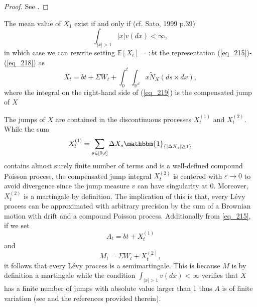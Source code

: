 \begin{proof}
See .
\end{proof}
\begin{remark}
The mean value of $X_1$ exist if and only if (cf. Sato, 1999 p.39) $$\int_{|x| > 1}  |x| v(dx)< \infty,$$ in which case we can rewrite setting $\mathbb{E}[X_t]=: bt$ the representation (\ref{eq_215})-(\ref{eq_218}) as 
\begin{equation}\label{eq_219}
    X_t = bt + \Sigma W_t + \int_0^t \int_{\mathbb{R}^d} x \tilde{N}_X (ds \times dx),
\end{equation}
where the integral on the right-hand side of (\ref{eq_219}) is the compensated jump of $X$
\end{remark}

\begin{interpretation}The jumps of $X$ are contained in the discontinuous processes $ X^{(1)}_t$ and $ X^{(2)}_t$. While the sum $$ X^{(1)}_t = \sum_{s \in [0,t]} \Delta X_s \mathbbm{1}_{\{|\Delta X_s|\geq 1\}} $$ contains almost surely finite number of terms and is a well-defined compound Poisson process, the compensated jump integral $X^{(2)}_t$ is centered with $\varepsilon \to 0$ to avoid divergence since the jump measure $v$ can have singularity at 0. Moreover, $ X^{(2)}_t$ is a martingale by definition.
The implication of this is that, every L\'evy process can be approximated with arbitrary precision by the sum of a Brownian motion with drift and a compound Poisson process.
Additionally from \eqref{eq_215}, if we set $$A_t = bt + X^{(1)}_t$$ and $$M_t = \Sigma W_t + X^{(2)}_t,$$ it follows that every L\'evy process is a semimartingale. This is because $M$ is by definition a martingale while the condition $\int_{|x| > 1} v(dx)< \infty$ verifies that $X$ has a finite number of jumps with absolute value larger than 1 thus $A$ is of finite variation (see  and the references provided therein).
\end{interpretation}


